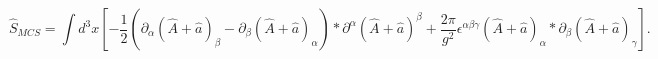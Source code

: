 \begin{equation}
\hat S_{MCS}=\int d^{3}x[-\frac{1}{2}(\partial_{\alpha}(\hat A +\hat a )_{\beta}-\partial_{\beta}(\hat A +\hat a )_{\alpha})*\partial^{\alpha}(\hat A +\hat a )^{\beta}+\frac{2\pi}{g^2}\epsilon^{\alpha\beta\gamma}(\hat A +\hat a )_{\alpha}*\partial_{\beta}(\hat A +\hat a )_{\gamma}].
\label{ncmcs}
\end{equation}

